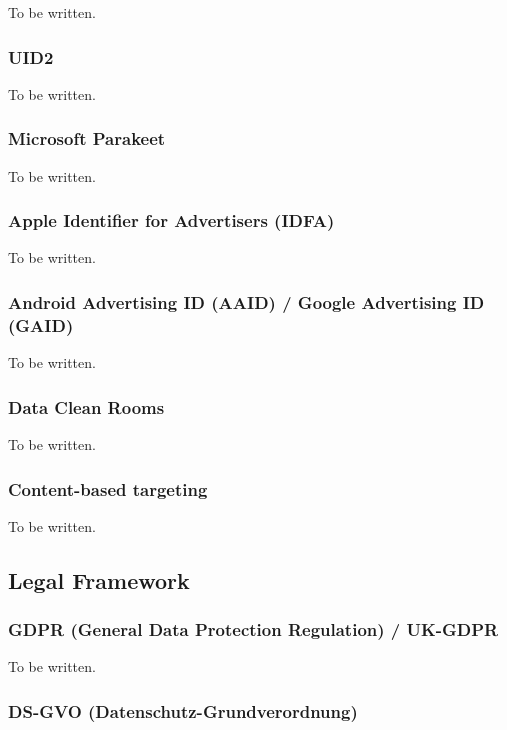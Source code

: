 To be written.

\subsubsection{UID2}

To be written.

\subsubsection{Microsoft Parakeet}

To be written.

\subsubsection{Apple Identifier for Advertisers (IDFA)}

To be written.

\subsubsection{Android Advertising ID (AAID) / Google Advertising ID (GAID)}

To be written.

\subsubsection{Data Clean Rooms}

To be written.

\subsubsection{Content-based targeting}

To be written.

\subsection{Legal Framework}

\subsubsection{GDPR (General Data Protection Regulation) / UK-GDPR}

To be written.

\subsubsection{DS-GVO (Datenschutz-Grundverordnung)}

